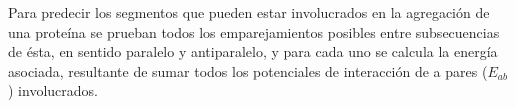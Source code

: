 
Para predecir los segmentos que pueden estar involucrados en la agregación de una proteína
se prueban todos los emparejamientos posibles entre subsecuencias de ésta, en sentido paralelo y antiparalelo, y para cada uno 
se calcula la energía asociada, resultante de sumar todos los potenciales de interacción de a pares ($E_{ab}$) involucrados.


